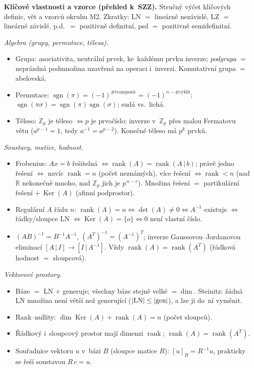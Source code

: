 \documentclass[11pt,a4paper]{article}
\newcommand{\rank}{\operatorname{rank}}
\newcommand{\Ker}{\operatorname{Ker}}
\newcommand{\sgn}{\operatorname{sgn}}
\begin{document}
\begin{poznamka}
\textbf{Klíčové vlastnosti a vzorce (přehled k~SZZ).} Stručný výčet klíčových definic, vět a vzorců okruhu M2. Zkratky: LN $=$ lineárně nezávislé, LZ $=$ lineárně závislé, p.d.\ $=$ pozitivně definitní, psd $=$ pozitivně semidefinitní.

\smallskip
\emph{Algebra (grupy, permutace, tělesa).}
\begin{itemize}
  \item Grupa: asociativita, neutrální prvek, ke~každému prvku inverze; \emph{podgrupa} $=$ neprázdná podmnožina uzavřená na operaci i~inverzi. Komutativní grupa $=$ abelovská.
  \item Permutace: $\sgn(\pi)=(-1)^{\#\text{transpozic}}=(-1)^{n-\#\text{cyklů}}$; $\sgn(\pi\sigma)=\sgn(\pi)\sgn(\sigma)$; sudá vs.\ lichá.
  \item Těleso: $\mathbb{Z}_p$ je těleso $\iff p$ je prvočíslo; inverze v~$\mathbb{Z}_p$ přes malou Fermatovu větu ($a^{p-1}=1$, tedy $a^{-1}=a^{p-2}$). Konečné těleso má $p^k$ prvků.
\end{itemize}

\smallskip
\emph{Soustavy, matice, hodnost.}
\begin{itemize}
  \item Frobenius: $Ax=b$ řešitelná $\iff\rank(A)=\rank(A\,|\,b)$; právě jedno řešení $\iff$ navíc $\rank=n$ (počet neznámých), více řešení $\iff\rank<n$ (nad $\mathbb{R}$ nekonečně mnoho, nad $\mathbb{Z}_p$ jich je $p^{\,n-r}$). Množina řešení $=$ partikulární řešení $+\,\Ker(A)$ (afinní podprostor).
  \item Regulární $A$ řádu $n$: $\rank(A)=n\iff\det(A)\ne0\iff A^{-1}$ existuje $\iff$ řádky/sloupce LN $\iff\Ker(A)=\{o\}\iff 0$ není vlastní číslo.
  \item $(AB)^{-1}=B^{-1}A^{-1}$, $(A^T)^{-1}=(A^{-1})^T$; inverze Gaussovou--Jordanovou eliminací $[A\,|\,I]\to[I\,|\,A^{-1}]$. Vždy $\rank(A)=\rank(A^T)$ (řádková hodnost $=$ sloupcová).
\end{itemize}

\smallskip
\emph{Vektorové prostory.}
\begin{itemize}
  \item Báze $=$ LN $+$ generuje; všechny báze stejně velké $=\dim$. Steinitz: žádná LN množina není větší než generující ($|{\rm LN}|\le|{\rm gen}|$), a lze ji do~ní vyměnit.
  \item Rank--nullity: $\dim\Ker(A)+\rank(A)=n$ (počet sloupců).
  \item Řádkový i~sloupcový prostor mají dimenzi $\rank$; $\rank(A)=\rank(A^T)$.
  \item Souřadnice vektoru $u$ v~bázi $B$ (sloupce matice $R$): $[u]_B=R^{-1}u$, prakticky se řeší soustavou $R\,c=u$.
\end{itemize}


\end{poznamka}
\end{document}
